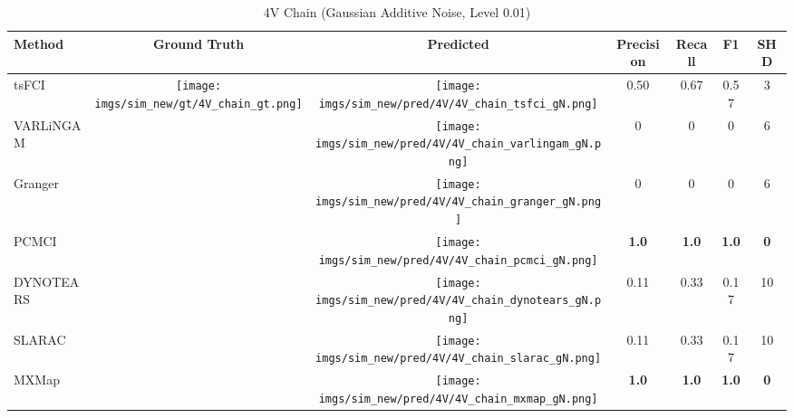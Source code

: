 \begin{table}[htb]
\begin{tabular}{l|c|c|c|c|c|c}
Method    & Ground Truth      & Predicted & Precision    & Recall       & F1           & SHD        \\ \hline
tsFCI     & \multirow{7}{*}[-0.7em]{\begin{minipage}{.17\linewidth} \centering \texttt{[image: imgs/sim\_new/gt/4V\_chain\_gt.png]} \end{minipage}} & \begin{minipage}{.17\linewidth} \centering \texttt{[image: imgs/sim\_new/pred/4V/4V\_chain\_tsfci\_gN.png]} \end{minipage}          & 0.50         & 0.67         & 0.57         & 3          \\
VARLiNGAM &                   & \begin{minipage}{.17\linewidth} \centering \texttt{[image: imgs/sim\_new/pred/4V/4V\_chain\_varlingam\_gN.png]} \end{minipage} & 0            & 0            & 0            & 6          \\
Granger   &                   & \begin{minipage}{.17\linewidth} \centering \texttt{[image: imgs/sim\_new/pred/4V/4V\_chain\_granger\_gN.png]} \end{minipage} & 0            & 0            & 0            & 6          \\
PCMCI     &                   & \begin{minipage}{.17\linewidth} \centering \texttt{[image: imgs/sim\_new/pred/4V/4V\_chain\_pcmci\_gN.png]} \end{minipage} & \textbf{1.0} & \textbf{1.0} & \textbf{1.0} & \textbf{0} \\
DYNOTEARS &                   & \begin{minipage}{.17\linewidth} \centering \texttt{[image: imgs/sim\_new/pred/4V/4V\_chain\_dynotears\_gN.png]} \end{minipage} & 0.11         & 0.33         & 0.17         & 10         \\
SLARAC    &                   & \begin{minipage}{.17\linewidth} \centering \texttt{[image: imgs/sim\_new/pred/4V/4V\_chain\_slarac\_gN.png]} \end{minipage} & 0.11         & 0.33         & 0.17         & 10         \\ \cline{1-1} \cline{3-7} 
MXMap     &                   &  \begin{minipage}{.17\linewidth} \centering \texttt{[image: imgs/sim\_new/pred/4V/4V\_chain\_mxmap\_gN.png]} \end{minipage}   & \textbf{1.0} & \textbf{1.0} & \textbf{1.0} & \textbf{0}
\end{tabular}
\caption{4V Chain (Gaussian Additive Noise, Level 0.01)}
\label{tab:4V_Chain_gN}
\end{table}

